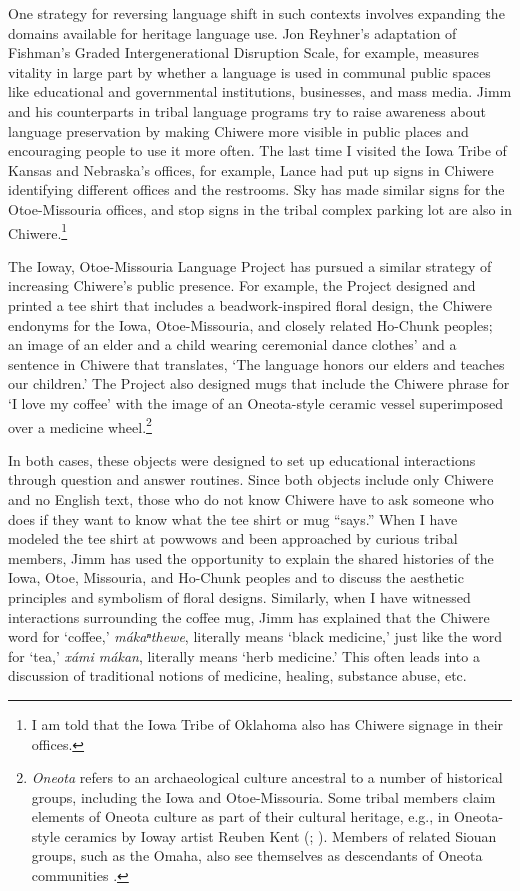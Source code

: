 \documentclass[output=paper]{LSP/langsci}
\begin{document}
One strategy for reversing language shift in such contexts involves expanding the domains available for heritage language use. Jon Reyhner's \citeyearpar[vii]{Reyhner1999} adaptation of Fishman's \citeyearpar{Fishman1991} Graded Intergenerational Disruption Scale, for example, measures vitality in large part by whether a language is used in communal public spaces like educational and governmental institutions, businesses, and mass media. Jimm and his counterparts in tribal language programs try to raise awareness about language preservation by making Chiwere more visible in public places and encouraging people to use it more often. The last time I visited the Iowa Tribe of Kansas and Nebraska's offices, for example, Lance had put up signs in Chiwere identifying different offices and the restrooms. Sky has made similar signs for the Otoe-Missouria offices, and stop signs in the tribal complex parking lot are also in Chiwere.\footnote{I am told that the Iowa Tribe of Oklahoma also has Chiwere signage in their offices.}

The Ioway, Otoe-Missouria Language Project has pursued a similar strategy of increasing Chiwere's public presence. For example, the Project designed and printed a tee shirt that includes a beadwork-inspired floral design, the Chiwere endonyms for the Iowa, Otoe-Missouria, and closely related Ho-Chunk peoples; an image of an elder and a child wearing ceremonial dance clothes' and a sentence in Chiwere that translates, `The language honors our elders and teaches our children.' The Project also designed mugs that include the Chiwere phrase for `I love my coffee' with the image of an Oneota-style ceramic vessel superimposed over a medicine wheel.\footnote{\emph{Oneota} refers to an archaeological culture ancestral to a number of historical groups, including the Iowa and Otoe-Missouria. Some tribal members claim elements of Oneota culture as part of their cultural heritage, e.g., in Oneota-style ceramics by Ioway artist Reuben Kent (\citeyear{KentND}; \citealt{RundleRundle2007}). Members of related Siouan groups, such as the Omaha, also see themselves as descendants of Oneota communities \citep{Buffalohead2004}.}

In both cases, these objects were designed to set up educational interactions through question and answer routines. Since both objects include only Chiwere and no English text, those who do not know Chiwere have to ask someone who does if they want to know what the tee shirt or mug ``says.'' When I have modeled the tee shirt at powwows and been approached by curious tribal members, Jimm has used the opportunity to explain the shared histories of the Iowa, Otoe, Missouria, and Ho-Chunk peoples and to discuss the aesthetic principles and symbolism of floral designs. Similarly, when I have witnessed interactions surrounding the coffee mug, Jimm has explained that the Chiwere word for `coffee,' \emph{m\'akaⁿthewe}, literally means `black medicine,' just like the word for `tea,' \emph{x\'ami m\'akan}, literally means `herb medicine.' This often leads into a discussion of traditional notions of medicine, healing, substance abuse, etc.
\end{document}
